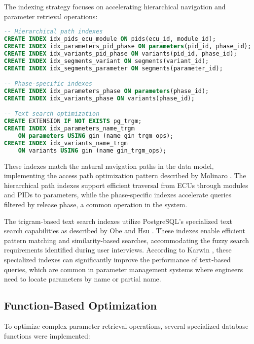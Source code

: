 The indexing strategy focuses on accelerating hierarchical navigation and parameter retrieval operations:

\begin{lstlisting}[language=SQL, caption={Core Index Implementation}, label={lst:core-indexes}]
-- Hierarchical path indexes
CREATE INDEX idx_pids_ecu_module ON pids(ecu_id, module_id);
CREATE INDEX idx_parameters_pid_phase ON parameters(pid_id, phase_id);
CREATE INDEX idx_variants_pid_phase ON variants(pid_id, phase_id);
CREATE INDEX idx_segments_variant ON segments(variant_id);
CREATE INDEX idx_segments_parameter ON segments(parameter_id);

-- Phase-specific indexes
CREATE INDEX idx_parameters_phase ON parameters(phase_id);
CREATE INDEX idx_variants_phase ON variants(phase_id);

-- Text search optimization
CREATE EXTENSION IF NOT EXISTS pg_trgm;
CREATE INDEX idx_parameters_name_trgm 
    ON parameters USING gin (name gin_trgm_ops);
CREATE INDEX idx_variants_name_trgm 
    ON variants USING gin (name gin_trgm_ops);
\end{lstlisting}

These indexes match the natural navigation paths in the data model, implementing the access path optimization pattern described by Molinaro \cite{molinaro2005sql}. The hierarchical path indexes support efficient traversal from ECUs through modules and \acp{PID} to parameters, while the phase-specific indexes accelerate queries filtered by release phase, a common operation in the system.

The trigram-based text search indexes utilize PostgreSQL's specialized text search capabilities as described by Obe and Hsu \cite{obe2017postgresql}. These indexes enable efficient pattern matching and similarity-based searches, accommodating the fuzzy search requirements identified during user interviews. According to Karwin \cite{karwin2010sql}, these specialized indexes can significantly improve the performance of text-based queries, which are common in parameter management systems where engineers need to locate parameters by name or partial name.

\subsection{Function-Based Optimization}
\label{subsec:function-based-optimization}

To optimize complex parameter retrieval operations, several specialized database functions were implemented:

